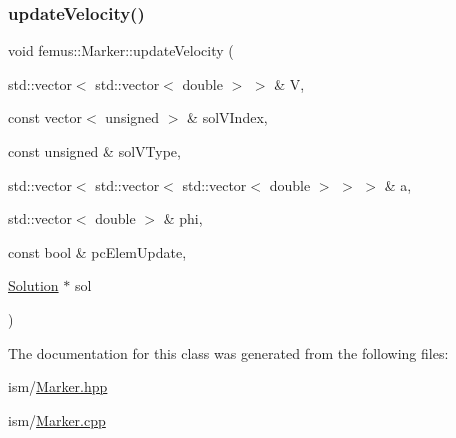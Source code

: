 \subsubsection{\texorpdfstring{update\+Velocity()}{updateVelocity()}}
{\footnotesize\ttfamily void femus\+::\+Marker\+::update\+Velocity (\begin{DoxyParamCaption}\item[{std\+::vector$<$ std\+::vector$<$ double $>$ $>$ \&}]{V,  }\item[{const vector$<$ unsigned $>$ \&}]{sol\+V\+Index,  }\item[{const unsigned \&}]{sol\+V\+Type,  }\item[{std\+::vector$<$ std\+::vector$<$ std\+::vector$<$ double $>$ $>$ $>$ \&}]{a,  }\item[{std\+::vector$<$ double $>$ \&}]{phi,  }\item[{const bool \&}]{pc\+Elem\+Update,  }\item[{\mbox{\hyperlink{classfemus_1_1_solution}{Solution}} $\ast$}]{sol }\end{DoxyParamCaption})}



The documentation for this class was generated from the following files\+:\begin{DoxyCompactItemize}
\item 
ism/\mbox{\hyperlink{_marker_8hpp}{Marker.\+hpp}}\item 
ism/\mbox{\hyperlink{_marker_8cpp}{Marker.\+cpp}}\end{DoxyCompactItemize}
